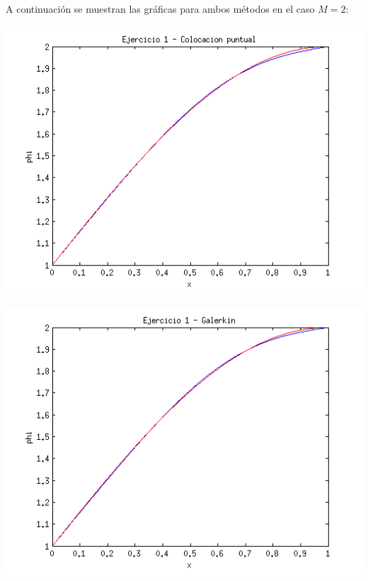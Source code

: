 \documentclass{article}
\begin{document}
\begin{enumerate}[1)]
{        \vspace{0.5cm}

        A continuación se muestran las gráficas para ambos métodos en el
        caso $M=2$:

        \includegraphics[width=\textwidth]{ej1_cp.png}

        \includegraphics[width=\textwidth]{ej1_galerkin.png}
    }
\end{enumerate}
\end{document}

